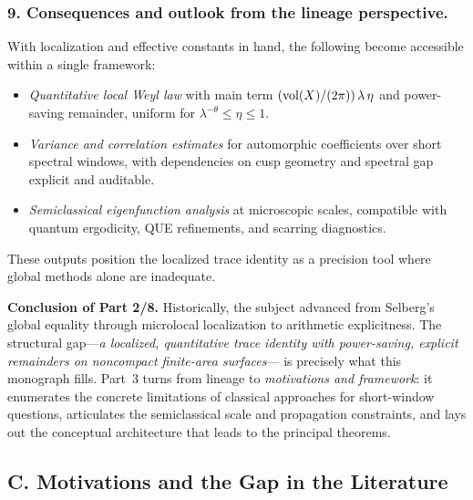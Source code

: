 \subsubsection*{9. Consequences and outlook from the lineage perspective.}
With localization and effective constants in hand, the following become accessible within a single framework:
\begin{itemize}
  \item \emph{Quantitative local Weyl law} with main term $(\operatorname{vol}(X)/(2\pi))\,\lambda\,\eta$ and power-saving remainder,
        uniform for $\lambda^{-\theta}\le\eta\le 1$.
  \item \emph{Variance and correlation estimates} for automorphic coefficients over short spectral windows,
        with dependencies on cusp geometry and spectral gap explicit and auditable.
  \item \emph{Semiclassical eigenfunction analysis} at microscopic scales, compatible with quantum ergodicity,
        QUE refinements, and scarring diagnostics.
\end{itemize}
These outputs position the localized trace identity as a precision tool where global methods alone are inadequate.

\medskip

\noindent\textbf{Conclusion of Part 2/8.}
Historically, the subject advanced from Selberg’s global equality through microlocal
localization to arithmetic explicitness. The structural gap—\emph{a localized, quantitative
trace identity with power-saving, explicit remainders on noncompact finite-area surfaces}—
is precisely what this monograph fills. Part~3 turns from lineage to \emph{motivations and
framework}: it enumerates the concrete limitations of classical approaches for short-window
questions, articulates the semiclassical scale and propagation constraints, and lays out the
conceptual architecture that leads to the principal theorems.

\subsection*{C. Motivations and the Gap in the Literature}


